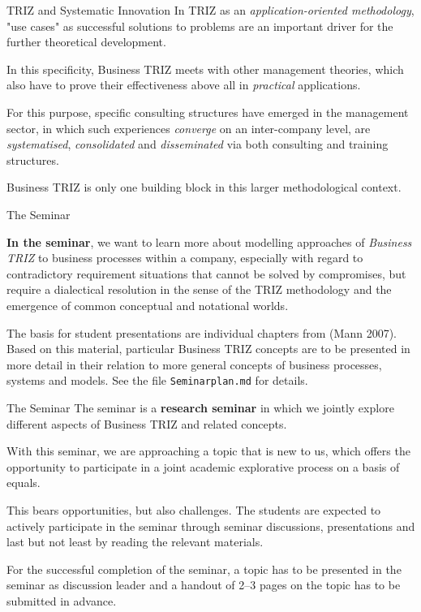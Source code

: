 \documentclass{beamer}
\begin{document}
\begin{frame}{TRIZ and Systematic Innovation}
In TRIZ as an \emph{application-oriented methodology}, "use cases" as
successful solutions to problems are an important driver for the further
theoretical development.

In this specificity, Business TRIZ meets with other management theories, which
also have to prove their effectiveness above all in \emph{practical}
applications.

For this purpose, specific consulting structures have emerged in the
management sector, in which such experiences \emph{converge} on an
inter-company level, are \emph{systematised}, \emph{consolidated} and
\emph{disseminated} via both consulting and training structures.

Business TRIZ is only one building block in this larger methodological
context.
\end{frame}

\begin{frame}{The Seminar}

\textbf{In the seminar}, we want to learn more about modelling approaches of
\emph{Business TRIZ} to business processes within a company, especially with
regard to contradictory requirement situations that cannot be solved by
compromises, but require a dialectical resolution in the sense of the TRIZ
methodology and the emergence of common conceptual and notational worlds.

The basis for student presentations are individual chapters from (Mann 2007).
Based on this material, particular Business TRIZ concepts are to be presented
in more detail in their relation to more general concepts of business
processes, systems and models.  See the file \texttt{Seminarplan.md} for
details.

\end{frame}

\begin{frame}{The Seminar}
The seminar is a \textbf{research seminar} in which we jointly explore
different aspects of Business TRIZ and related concepts.

With this seminar, we are approaching a topic that is new to us, which offers
the opportunity to participate in a joint academic explorative process on a
basis of equals.

This bears opportunities, but also challenges.  The students are expected to
actively participate in the seminar through seminar discussions, presentations
and last but not least by reading the relevant materials.

For the successful completion of the seminar, a topic has to be presented in
the seminar as discussion leader and a handout of 2--3 pages on the topic has
to be submitted in advance.
\end{frame}
\end{document}
